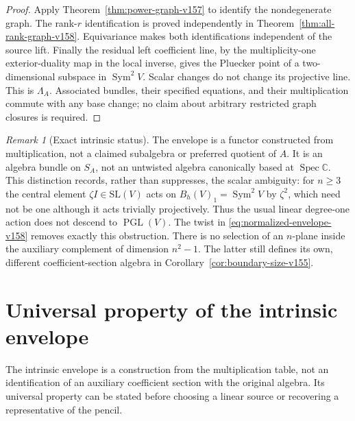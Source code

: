 \documentclass[11pt,reqno]{amsart}
\numberwithin{equation}{section}
\theoremstyle{definition}\newtheorem{definition}[theorem]{Definition}
\theoremstyle{remark}\newtheorem{remark}[theorem]{Remark}
\newcommand{\C}{\mathbb C}\newcommand{\Q}{\mathbb Q}
\DeclareMathOperator{\Sym}{Sym}\DeclareMathOperator{\Gr}{Gr}
\DeclareMathOperator{\Spec}{Spec}\DeclareMathOperator{\PGL}{PGL}
\begin{document}
\begin{proof}
Apply Theorem~\ref{thm:power-graph-v157} to identify the nondegenerate
graph. The rank-$r$ identification is proved independently in
Theorem~\ref{thm:all-rank-graph-v158}. Equivariance makes both
identifications independent of the source lift. Finally the residual
left coefficient line, by the multiplicity-one exterior-duality map
in the local inverse, gives the Pluecker point of a two-dimensional
subspace in $\Sym^2V$. Scalar changes do not change its projective
line. This is $\Lambda_A$. Associated bundles, their specified
equations, and their multiplication commute with any base change;
no claim about arbitrary restricted graph closures is required.
\end{proof}

\begin{remark}[Exact intrinsic status]
\label{rem:envelope-status-v158}
The envelope is a functor constructed from multiplication, not a claimed
subalgebra or preferred quotient of $A$. It is an algebra bundle on
$S_A$, not an untwisted algebra canonically based at $\Spec\C$.
This distinction records, rather than suppresses, the scalar ambiguity:
for $n\geq3$ the central element $\zeta I\in\mathrm{SL}(V)$ acts on
$B_h(V)_1=\Sym^2V$ by $\zeta^2$, which need not be one although it
acts trivially projectively. Thus the usual linear degree-one action
does not descend to $\PGL(V)$. The twist in
\eqref{eq:normalized-envelope-v158} removes exactly this obstruction.
There is no selection of an $n$-plane inside the auxiliary complement
of dimension $n^2-1$. The latter still defines its own, different
coefficient-section algebra in Corollary~\ref{cor:boundary-size-v155}.
\end{remark}


\section{Universal property of the intrinsic envelope}
\label{sec:universal-envelope-v159}
The intrinsic envelope is a construction from the multiplication table,
not an identification of an auxiliary coefficient section with the
original algebra. Its universal property can be stated before choosing
a linear source or recovering a representative of the pencil.
\end{document}
